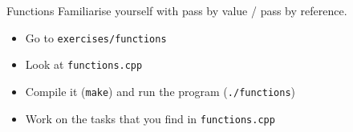 \begin{frame}[fragile]
  \begin{exercise}{Functions}
    Familiarise yourself with pass by value / pass by reference.
    \begin{itemize}
      \item Go to \texttt{exercises/functions}
      \item Look at \texttt{functions.cpp}
      \item Compile it (\texttt{make}) and run the program (\texttt{./functions})
      \item Work on the tasks that you find in \texttt{functions.cpp}
    \end{itemize}
  \end{exercise}
\end{frame}

